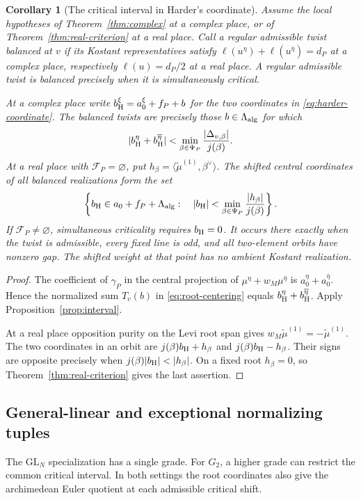 \documentclass[12pt]{amsart}
\numberwithin{equation}{section}
\theoremstyle{plain}
\newtheorem{corollary}[theorem]{Corollary}
\theoremstyle{definition}
\theoremstyle{remark}
\renewcommand{\bar}{\overline}
\newcommand{\GL}{\mathrm{GL}}
\begin{document}
\begin{corollary}[The critical interval in Harder's coordinate] \label{cor:harder-interval}
Assume the local hypotheses of Theorem~\ref{thm:complex} at a complex place, or of Theorem~\ref{thm:real-criterion} at a real place. Call a regular admissible twist \emph{balanced at $v$} if its Kostant representatives satisfy $\ell(u^\eta)+\ell(u^{\bar\eta})=d_P$ at a complex place, respectively $\ell(u)=d_P/2$ at a real place. A regular admissible twist is balanced precisely when it is simultaneously critical.

At a complex place write $b_{\rm H}^{\xi}=a_0^\xi+f_P+b$ for the two coordinates in \eqref{eq:harder-coordinate}. The balanced twists are precisely those $b\in\Lambda_{\rm alg}$ for which 
\[
 |b_{\rm H}^{\eta}+b_{\rm H}^{\bar\eta}|<
 \min_{\beta\in\Psi_P}\frac{|\Delta_{v,\beta}|}{j(\beta)}.
\]
At a real place with $\mathcal F_P=\varnothing$, put $h_\beta=\langle\widetilde\mu^{(1)},\beta^\vee\rangle$. The shifted central coordinates of all balanced realizations form the set 
\[
 \left\{b_{\rm H}\in a_0+f_P+\Lambda_{\rm alg}:\quad
 |b_{\rm H}|<\min_{\beta\in\Psi_P}\frac{|h_\beta|}{j(\beta)}\right\}.
\]
If $\mathcal F_P\ne\varnothing$, simultaneous criticality requires $b_{\rm H}=0$. It occurs there exactly when the twist is admissible, every fixed line is odd, and all two-element orbits have nonzero gap. The shifted weight at that point has no ambient Kostant realization. 
\end{corollary}
\begin{proof}
The coefficient of $\gamma_P$ in the central projection of $\mu^\eta+w_M\mu^{\bar\eta}$ is $a_0^\eta+a_0^{\bar\eta}$. Hence the normalized sum $T_v(b)$ in \eqref{eq:root-centering} equals $b_{\rm H}^{\eta}+b_{\rm H}^{\bar\eta}$. Apply Proposition~\ref{prop:interval}.

At a real place opposition purity on the Levi root span gives $w_M\widetilde\mu^{(1)}=-\widetilde\mu^{(1)}$. The two coordinates in an orbit are $j(\beta)b_{\rm H}+h_\beta$ and $j(\beta)b_{\rm H}-h_\beta$. Their signs are opposite precisely when $j(\beta)|b_{\rm H}|<|h_\beta|$. On a fixed root $h_\beta=0$, so Theorem~\ref{thm:real-criterion} gives the last assertion. 
\end{proof}

\subsection{General-linear and exceptional normalizing tuples} \label{sec:complex-example}
The $\GL_N$ specialization has a single grade. For $G_2$, a higher grade can restrict the common critical interval. In both settings the root coordinates also give the archimedean Euler quotient at each admissible critical shift. 
\end{document}
